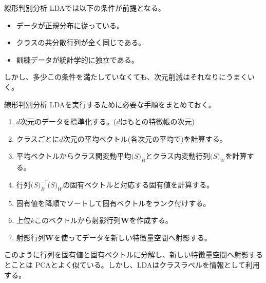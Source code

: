 \documentclass[aspectratio=169, dvipdfmx, 11pt]{beamer} %
\begin{document}
\begin{frame}{線形判別分析}
    LDAでは以下の条件が前提となる。
    \begin{itemize}
        \item データが正規分布に従っている。
        \item クラスの共分散行列が全く同じである。
        \item 訓練データが統計学的に独立である。
    \end{itemize}
    \vspace{1em}
    しかし、多少この条件を満たしていなくても、次元削減はそれなりにうまくいく。
\end{frame}

\begin{frame}{線形判別分析}
    LDAを実行するために必要な手順をまとめておく。
    \vspace{1em}
    \begin{enumerate}
        \item \(d\)次元のデータを標準化する。(\(d\)はもとの特徴帳の次元)
        \item クラスごとに\(d\)次元の平均ベクトル(各次元の平均で)を計算する。
        \item 平均ベクトルからクラス間変動平均\(\bm(S)_B\)とクラス内変動行列\(\bm(S)_W\)を計算する。
        \item 行列\(\bm(S)_{B}^{-1} \bm(S)_W\)の固有ベクトルと対応する固有値を計算する。
        \item 固有値を降順でソートして固有ベクトルをランク付けする。
        \item 上位\(k\)このベクトルから射影行列\(\bm{W}\)を作成する。
        \item 射影行列\(\bm{W}\)を使ってデータを新しい特徴量空間へ射影する。
    \end{enumerate}
    \vspace{1em}
    このように行列を固有値と固有ベクトルに分解し、新しい特徴量空間へ射影するとことは
    PCAとよく似ている。しかし、LDAはクラスラベルを情報として利用する。
\end{frame}
\end{document}
